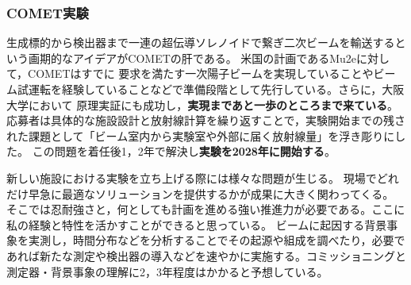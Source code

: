 \documentclass[11pt,a4paper,uplatex,dvipdfmx]{ujarticle} 		%
\newcommand{\研究課題名}{象の卵}
\newcommand{\研究機関名}{東京大学}
\newcommand{\研究代表者氏名}{内山雄祐}
\newcommand{\研究期間の最終元号年度}{6}  %
\renewcommand{\emph}[1]{{\sffamily\bfseries{#1}}}
\newcommand*{\mueconv}{\muup^-\mathrm{N \to e^-N}}
\begin{document}
\subsubsection{COMET実験}
生成標的から検出器まで一連の超伝導ソレノイドで繋ぎ二次ビームを輸送するという画期的なアイデアがCOMETの肝である。%
米国の計画であるMu2eに対して，COMETはすでに
要求を満たす一次陽子ビームを実現していることやビーム試運転を経験していることなどで準備段階として先行している。さらに，大阪大学において
原理実証にも成功し，\emph{実現まであと一歩のところまで来ている}。
応募者は具体的な施設設計と放射線計算を繰り返すことで，実験開始までの残された課題として「ビーム室内から実験室や外部に届く放射線量」を浮き彫りにした。%
この問題を着任後1，2年で解決し\emph{実験を2028年に開始する}。

新しい施設における実験を立ち上げる際には様々な問題が生じる。%
現場でどれだけ早急に最適なソリューションを提供するかが成果に大きく関わってくる。
そこでは忍耐強さと，何としても計画を進める強い推進力が必要である。ここに私の経験と特性を活かすことができると思っている。
ビームに起因する背景事象を実測し，時間分布などを分析することでその起源や組成を調べたり，必要であれば新たな測定や検出器の導入などを速やかに実施する。コミッショニングと測定器・背景事象の理解に2，3年程度はかかると予想している。
\end{document}
